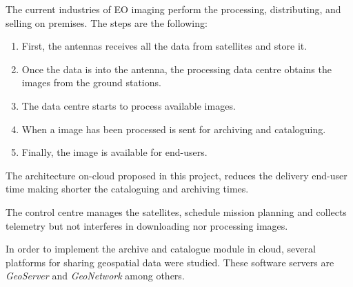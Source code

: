 The current industries of \ac{EO} imaging perform the processing, distributing, and
selling on premises. The steps are the following:
\begin{enumerate}
\item First, the antennas receives all the data from satellites and store it.
\item Once the data is into the antenna, the processing data centre obtains the
  images from the ground stations.
\item The data centre starts to process available images.
\item When a image has been processed is sent for archiving and
  cataloguing. 
\item Finally, the image is available for end-users.
\end{enumerate}

The architecture on-cloud proposed in this project, reduces the delivery
end-user time making shorter the cataloguing and archiving times.

The control centre manages the satellites, schedule mission planning and
collects telemetry but not interferes in downloading nor processing images.

In order to implement the archive and catalogue module in cloud, several
platforms for sharing geospatial data were studied. These software servers are
\emph{GeoServer} and \emph{GeoNetwork} among others.

